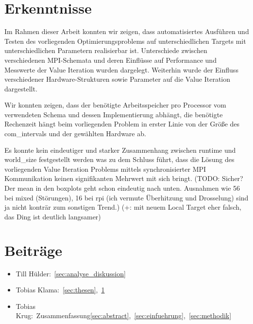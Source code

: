 \section{Erkenntnisse}
\label{sec:erkenntnisse}
Im Rahmen dieser Arbeit konnten wir zeigen, dass automatisiertes Ausführen und Testen des vorliegenden Optimierungsproblems
auf unterschiedlichen Targets mit unterschiedlichen Parametern realisierbar ist.
Unterschiede zwischen verschiedenen MPI-Schemata und deren Einflüsse auf Performance und Messwerte der Value Iteration wurden dargelegt.
Weiterhin wurde der Einfluss verschiedener Hardware-Strukturen sowie Parameter auf die Value Iteration dargestellt.

Wir konnten zeigen, dass der benötigte Arbeitsspeicher pro Processor vom verwendeten Schema und dessen Implementierung abhängt,
die benötigte Rechenzeit hängt beim vorliegenden Problem in erster Linie von der Größe des com\_intervals und der gewählten Hardware ab.

Es konnte kein eindeutiger und starker Zusammenhang zwischen runtime und world\_size festgestellt werden was zu dem Schluss führt, dass
die Lösung des vorliegenden Value Iteration Problems mittels synchronisierter MPI Kommunikation keinen signifikanten Mehrwert mit sich bringt. (TODO: Sicher? Der mean in den boxplots geht schon eindeutig nach unten. Ausnahmen wie 56 bei mixed (Störungen), 16 bei rpi (ich vermute Überhitzung und Drosselung) sind ja nicht konträr zum sonstigen Trend.) (+: mit neuem Local Target eher falsch, das Ding ist deutlich langsamer)

\section{Beiträge}
\label{sec:beitraege}

\begin{itemize}
    \item Till Hülder:~\ref{sec:analyse_diskussion}
    \item Tobias Klama:~\ref{sec:thesen},~\ref{sec:erkenntnisse}
    \item Tobias Krug:~Zusammenfassung\ref{sec:abstract},~\ref{sec:einfuehrung},~\ref{sec:methodik}
\end{itemize}